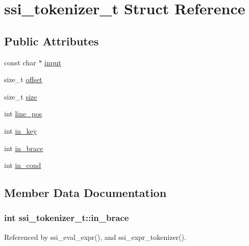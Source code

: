 \hypertarget{structssi__tokenizer__t}{\section{ssi\-\_\-tokenizer\-\_\-t Struct Reference}
\label{structssi__tokenizer__t}
}
\subsection*{Public Attributes}
\begin{DoxyCompactItemize}
\item 
const char $\ast$ \hyperlink{structssi__tokenizer__t_a56516bdc99535dd2996f82cf10bffad9}{input}
\item 
size\-\_\-t \hyperlink{structssi__tokenizer__t_aeb19813b49fdb8894fa51ca01b7f8962}{offset}
\item 
size\-\_\-t \hyperlink{structssi__tokenizer__t_a0ab7f1a6e97b14bcf9420108fee372eb}{size}
\item 
int \hyperlink{structssi__tokenizer__t_a701d642a84e2e98909fb44c570994b87}{line\-\_\-pos}
\item 
int \hyperlink{structssi__tokenizer__t_a0e0825859d295df9c18103821d9b8637}{in\-\_\-key}
\item 
int \hyperlink{structssi__tokenizer__t_aeddfa1b9f3b6a7e482ba9f6f22548062}{in\-\_\-brace}
\item 
int \hyperlink{structssi__tokenizer__t_a93046475ccb0bb6e558b0e3263ac3d05}{in\-\_\-cond}
\end{DoxyCompactItemize}


\subsection{Member Data Documentation}
\hypertarget{structssi__tokenizer__t_aeddfa1b9f3b6a7e482ba9f6f22548062}{
\subsubsection[{in\-\_\-brace}]{\setlength{\rightskip}{0pt plus 5cm}int ssi\-\_\-tokenizer\-\_\-t\-::in\-\_\-brace}}\label{structssi__tokenizer__t_aeddfa1b9f3b6a7e482ba9f6f22548062}


Referenced by ssi\-\_\-eval\-\_\-expr(), and ssi\-\_\-expr\-\_\-tokenizer().

